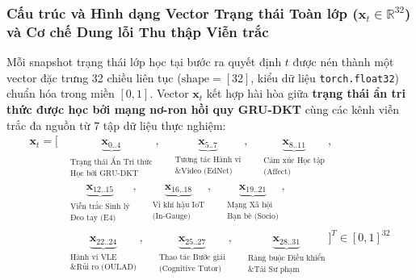 \subsubsection{Cấu trúc và Hình dạng Vector Trạng thái Toàn lớp ($\mathbf{x}_t \in \mathbb{R}^{32}$) và Cơ chế Dung lỗi Thu thập Viễn trắc}\label{subsubsec:state-vector-32d}
Mỗi snapshot trạng thái lớp học tại bước ra quyết định $t$ được nén thành một vector đặc trưng 32 chiều liên tục ($\text{shape} = [32]$, kiểu dữ liệu \texttt{torch.float32}) chuẩn hóa trong miền $[0, 1]$. Vector $\mathbf{x}_t$ kết hợp hài hòa giữa \textbf{trạng thái ẩn tri thức được học bởi mạng nơ-ron hồi quy GRU-DKT} cùng các kênh viễn trắc đa nguồn từ 7 tập dữ liệu thực nghiệm:
\begin{equation}\label{eq:state-32d-formulation}
\begin{aligned}
  \mathbf{x}_t = \Big[ & \underbrace{\mathbf{x}_{0..4}}_{\substack{\text{Trạng thái Ẩn Tri thức} \\ \text{Học bởi GRU-DKT}}}, \quad 
                         \underbrace{\mathbf{x}_{5..7}}_{\substack{\text{Tương tác Hành vi} \\ \text{\& Video (EdNet)}}}, \quad 
                         \underbrace{\mathbf{x}_{8..11}}_{\substack{\text{Cảm xúc Học tập} \\ \text{(Affect)}}}, \\
                       & \underbrace{\mathbf{x}_{12..15}}_{\substack{\text{Viễn trắc Sinh lý} \\ \text{Đeo tay (E4)}}}, \quad 
                         \underbrace{\mathbf{x}_{16..18}}_{\substack{\text{Vi khí hậu IoT} \\ \text{(In-Gauge)}}}, \quad 
                         \underbrace{\mathbf{x}_{19..21}}_{\substack{\text{Mạng Xã hội} \\ \text{Bạn bè (Socio)}}}, \\
                       & \underbrace{\mathbf{x}_{22..24}}_{\substack{\text{Hành vi VLE} \\ \text{\& Rủi ro (OULAD)}}}, \quad 
                         \underbrace{\mathbf{x}_{25..27}}_{\substack{\text{Thao tác Bước giải} \\ \text{(Cognitive Tutor)}}}, \quad 
                         \underbrace{\mathbf{x}_{28..31}}_{\substack{\text{Ràng buộc Điều khiển} \\ \text{\& Tải Sư phạm}}} \Big]^T \in [0, 1]^{32}
\end{aligned}
\end{equation}


